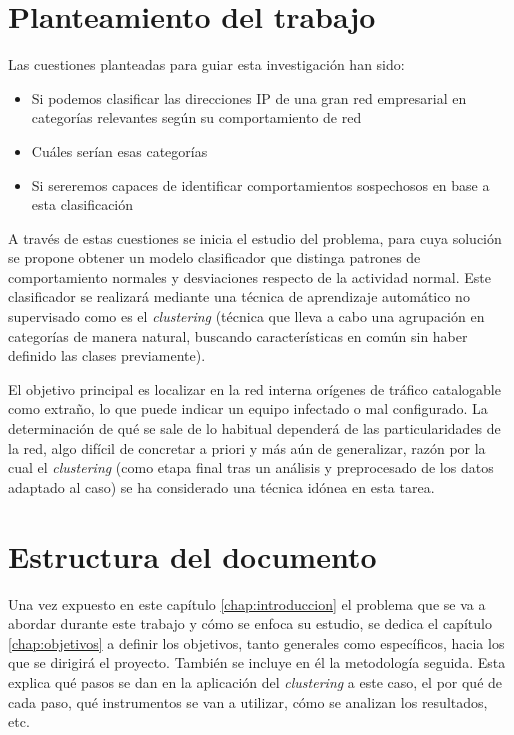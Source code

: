 \section{Planteamiento del trabajo}\label{sec:objetivos}

Las cuestiones planteadas para guiar esta investigación han sido:
\begin{itemize}
    \item Si podemos clasificar las direcciones IP de una gran red empresarial en categorías relevantes según su comportamiento de red
    \item Cuáles serían esas categorías
    \item Si sereremos capaces de identificar comportamientos sospechosos en base a esta clasificación
\end{itemize}

A través de estas cuestiones se inicia el estudio del problema, para cuya solución se propone obtener un modelo clasificador que distinga patrones de comportamiento normales y desviaciones respecto de la actividad normal.
Este clasificador se realizará mediante una técnica de aprendizaje automático no supervisado como es el \emph{clustering}
(técnica que lleva a cabo una agrupación en categorías de manera natural, buscando características en común sin haber definido las clases previamente).

El objetivo principal es localizar en la red interna orígenes de tráfico catalogable como extraño, lo que puede indicar un equipo infectado o mal configurado.
La determinación de qué se sale de lo habitual dependerá de las particularidades de la red, algo difícil de concretar a priori y más aún de generalizar,
razón por la cual el \emph{clustering} (como etapa final tras un análisis y preprocesado de los datos adaptado al caso) se ha considerado una técnica idónea en esta tarea.

\section{Estructura del documento}\label{sec:estructura}

Una vez expuesto en este capítulo \ref{chap:introduccion} el problema que se va a abordar durante este trabajo y cómo se enfoca su estudio,
se dedica el capítulo \ref{chap:objetivos} a definir los objetivos, tanto generales como específicos, hacia los que se dirigirá el proyecto.
También se incluye en él la metodología seguida.
Esta explica qué pasos se dan en la aplicación del \emph{clustering} a este caso, el por qué de cada paso, qué instrumentos se van a utilizar, cómo se analizan los resultados, etc.

